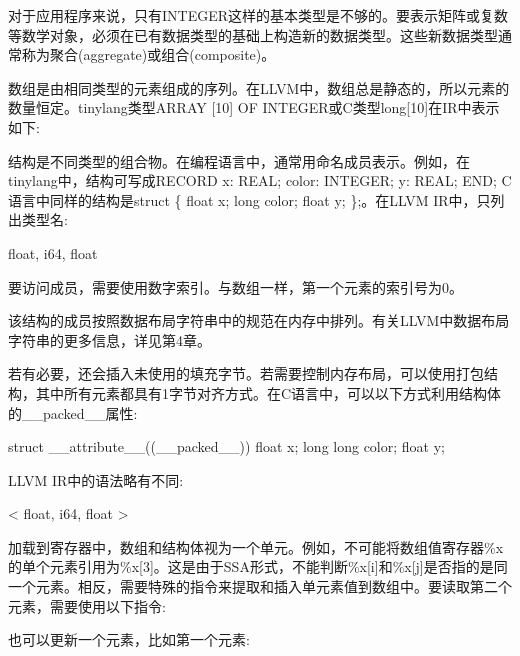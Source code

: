 对于应用程序来说，只有INTEGER这样的基本类型是不够的。要表示矩阵或复数等数学对象，必须在已有数据类型的基础上构造新的数据类型。这些新数据类型通常称为聚合(aggregate)或组合(composite)。

数组是由相同类型的元素组成的序列。在LLVM中，数组总是静态的，所以元素的数量恒定。tinylang类型ARRAY [10] OF INTEGER或C类型long[10]在IR中表示如下:

\begin{shell}
[10 x i64]
\end{shell}

结构是不同类型的组合物。在编程语言中，通常用命名成员表示。例如，在tinylang中，结构可写成RECORD x: REAL;  color: INTEGER;  y: REAL;  END; C语言中同样的结构是struct \{ float x; long color; float y; \};。在LLVM IR中，只列出类型名:

\begin{shell}
{ float, i64, float }
\end{shell}

要访问成员，需要使用数字索引。与数组一样，第一个元素的索引号为0。

该结构的成员按照数据布局字符串中的规范在内存中排列。有关LLVM中数据布局字符串的更多信息，详见第4章。

若有必要，还会插入未使用的填充字节。若需要控制内存布局，可以使用打包结构，其中所有元素都具有1字节对齐方式。在C语言中，可以以下方式利用结构体的\_\_packed\_\_属性:

\begin{cpp}
struct __attribute__((__packed__)) { float x; long long color; float y; }
\end{cpp}

LLVM IR中的语法略有不同:

\begin{shell}
<{ float, i64, float }>
\end{shell}

加载到寄存器中，数组和结构体视为一个单元。例如，不可能将数组值寄存器\%x的单个元素引用为\%x[3]。这是由于SSA形式，不能判断\%x[i]和\%x[j]是否指的是同一个元素。相反，需要特殊的指令来提取和插入单元素值到数组中。要读取第二个元素，需要使用以下指令:

\begin{shell}
\end{shell}

也可以更新一个元素，比如第一个元素:

\begin{shell}
\end{shell}


